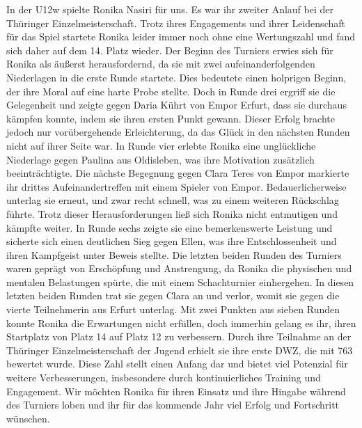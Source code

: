 \documentclass[a4paper,ngerman]{tui-algo-seminar}
\begin{document}
In der U12w spielte Ronika Nasiri für uns. Es war ihr zweiter Anlauf bei der Thüringer Einzelmeisterschaft. Trotz ihres Engagements und ihrer Leidenschaft für das Spiel startete Ronika leider immer noch ohne eine Wertungszahl und fand sich daher auf dem 14. Platz wieder. Der Beginn des Turniers erwies sich für Ronika als äußerst herausfordernd, da sie mit zwei aufeinanderfolgenden Niederlagen in die erste Runde startete. Dies bedeutete einen holprigen Beginn, der ihre Moral auf eine harte Probe stellte. Doch in Runde drei ergriff sie die Gelegenheit und zeigte gegen Daria Kührt von Empor Erfurt, dass sie durchaus kämpfen konnte, indem sie ihren ersten Punkt gewann. Dieser Erfolg brachte jedoch nur vorübergehende Erleichterung, da das Glück in den nächsten Runden nicht auf ihrer Seite war.
In Runde vier erlebte Ronika eine unglückliche Niederlage gegen Paulina aus Oldisleben, was ihre Motivation zusätzlich beeinträchtigte. Die nächste Begegnung gegen Clara Teres von Empor markierte ihr drittes Aufeinandertreffen mit einem Spieler von Empor. Bedauerlicherweise unterlag sie erneut, und zwar recht schnell, was zu einem weiteren Rückschlag führte. Trotz dieser Herausforderungen ließ sich Ronika nicht entmutigen und kämpfte weiter.
In Runde sechs zeigte sie eine bemerkenswerte Leistung und sicherte sich einen deutlichen Sieg gegen Ellen, was ihre Entschlossenheit und ihren Kampfgeist unter Beweis stellte. Die letzten beiden Runden des Turniers waren geprägt von Erschöpfung und Anstrengung, da Ronika die physischen und mentalen Belastungen spürte, die mit einem Schachturnier einhergehen. In diesen letzten beiden Runden trat sie gegen Clara an und verlor, womit sie gegen die vierte Teilnehmerin aus Erfurt unterlag.
Mit zwei Punkten aus sieben Runden konnte Ronika die Erwartungen nicht erfüllen, doch immerhin gelang es ihr, ihren Startplatz von Platz 14 auf Platz 12 zu verbessern. Durch ihre Teilnahme an der Thüringer Einzelmeisterschaft der Jugend erhielt sie ihre erste DWZ, die mit 763 bewertet wurde. Diese Zahl stellt einen Anfang dar und bietet viel Potenzial für weitere Verbesserungen, insbesondere durch kontinuierliches Training und Engagement. Wir möchten Ronika für ihren Einsatz und ihre Hingabe während des Turniers loben und ihr für das kommende Jahr viel Erfolg und Fortschritt wünschen.\\
\end{document}
